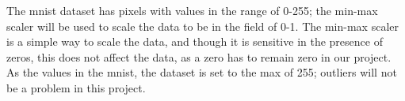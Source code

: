 


The \gls{mnist} dataset has pixels with values in the range of 0-255; the min-max scaler will be used to scale the data to be in the field of 0-1. The min-max scaler is a simple way to scale the data, and though it is sensitive in the presence of zeros, this does not affect the data, as a zero has to remain zero in our project. As the values in the \gls{mnist}, the dataset is set to the max of 255; outliers will not be a problem in this project.